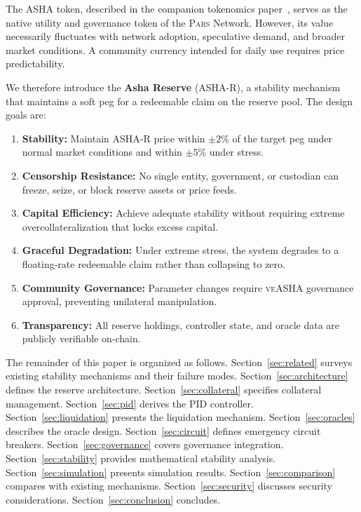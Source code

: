 \documentclass[11pt,a4paper]{article}
\newcommand{\Pars}{\textsc{Pars}\xspace}
\newcommand{\asha}{\textsc{ASHA}\xspace}
\newcommand{\veasha}{\textsc{veASHA}\xspace}
\newcommand{\ashares}{\textsc{ASHA-R}\xspace}
\begin{document}
The \asha token, described in the companion tokenomics paper~\citep{parsveasha2026}, serves as the native utility and governance token of the \Pars Network.
However, its value necessarily fluctuates with network adoption, speculative demand, and broader market conditions.
A community currency intended for daily use requires price predictability.

We therefore introduce the \textbf{Asha Reserve} (\ashares), a stability mechanism that maintains a soft peg for a redeemable claim on the reserve pool.
The design goals are:

\begin{enumerate}[label=\textbf{G\arabic*}:]
  \item \textbf{Stability:} Maintain \ashares price within $\pm 2\%$ of the target peg under normal market conditions and within $\pm 5\%$ under stress.
  \item \textbf{Censorship Resistance:} No single entity, government, or custodian can freeze, seize, or block reserve assets or price feeds.
  \item \textbf{Capital Efficiency:} Achieve adequate stability without requiring extreme overcollateralization that locks excess capital.
  \item \textbf{Graceful Degradation:} Under extreme stress, the system degrades to a floating-rate redeemable claim rather than collapsing to zero.
  \item \textbf{Community Governance:} Parameter changes require \veasha governance approval, preventing unilateral manipulation.
  \item \textbf{Transparency:} All reserve holdings, controller state, and oracle data are publicly verifiable on-chain.
\end{enumerate}

The remainder of this paper is organized as follows.
Section~\ref{sec:related} surveys existing stability mechanisms and their failure modes.
Section~\ref{sec:architecture} defines the reserve architecture.
Section~\ref{sec:collateral} specifies collateral management.
Section~\ref{sec:pid} derives the PID controller.
Section~\ref{sec:liquidation} presents the liquidation mechanism.
Section~\ref{sec:oracles} describes the oracle design.
Section~\ref{sec:circuit} defines emergency circuit breakers.
Section~\ref{sec:governance} covers governance integration.
Section~\ref{sec:stability} provides mathematical stability analysis.
Section~\ref{sec:simulation} presents simulation results.
Section~\ref{sec:comparison} compares with existing mechanisms.
Section~\ref{sec:security} discusses security considerations.
Section~\ref{sec:conclusion} concludes.
\end{document}
